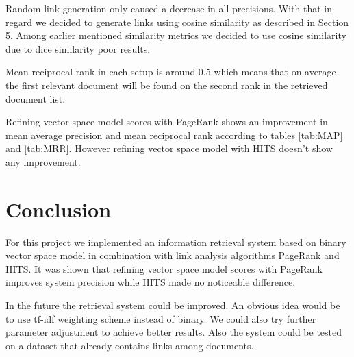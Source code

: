 \documentclass[10pt, a4paper]{article}
\begin{document}
Random link generation only caused a decrease in all precisions. With that in regard we decided to generate links using cosine similarity as described in Section 5. Among earlier mentioned similarity metrics we decided to use cosine similarity due to dice similarity poor results.

Mean reciprocal rank in each setup is around 0.5 which means that on average the first relevant document will be found on the second rank in the retrieved document list.

Refining vector space model scores with PageRank shows an improvement in mean average precision and mean reciprocal rank according to tables \ref{tab:MAP} and \ref{tab:MRR}. However refining vector space model with HITS doesn't show any improvement.

\section{Conclusion}
For this project we implemented an information retrieval system based on binary vector space model in combination with link analysis algorithms PageRank and HITS. It was shown that refining vector space model scores with PageRank improves system precision while HITS made no noticeable difference.

In the future the retrieval system could be improved. An obvious idea would be to use tf-idf weighting scheme instead of binary. We could also try further parameter adjustment to achieve better results. Also the system could be tested on a dataset that already contains links among documents.




\end{document}
